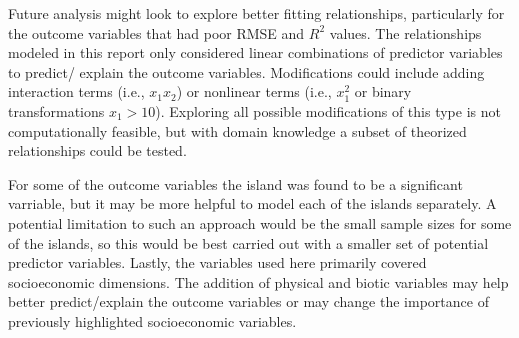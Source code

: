\documentclass{article}
\begin{document}
Future analysis might look to explore better fitting relationships, particularly for the outcome variables that had poor RMSE and 
$R^2$ values. The relationships modeled in this report only considered linear combinations of predictor variables to predict/
explain the outcome variables. Modifications could include adding interaction terms (i.e., $x_1x_2$) or nonlinear terms (i.e., 
$x_1^2$ or binary transformations $x_1 > 10$). Exploring all possible modifications of this type is not computationally feasible, 
but with domain knowledge a subset of theorized relationships could be tested. 

For some of the outcome variables the island was found to be a significant varriable, but it may be more helpful to model each 
of the islands separately. A potential limitation to such an approach would be the small sample sizes for some of the islands, so 
this would be best carried out with a smaller set of potential predictor variables. Lastly, the variables used here primarily 
covered socioeconomic dimensions. The addition of physical and biotic variables may help better predict/explain the outcome 
variables or may change the importance of previously highlighted socioeconomic variables.


\medskip

\small
\end{document}

